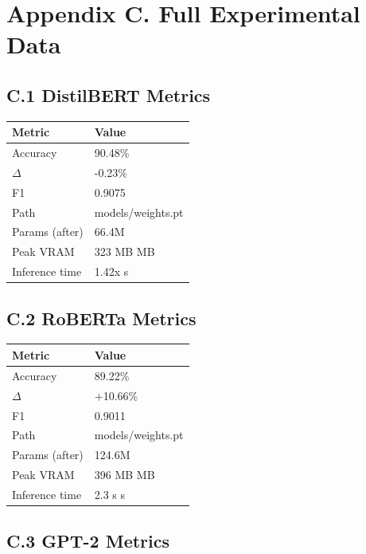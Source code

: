 
\section{Appendix C. Full Experimental Data}

\subsection{C.1 DistilBERT Metrics}

\begin{table}[H]
\centering
\small
\begin{tabular}{ll}
\toprule
\textbf{Metric} & \textbf{Value} \\
\midrule
Accuracy & 90.48\% \\
$\Delta$ & -0.23\% \\
F1 & 0.9075 \\
Path & models/weights.pt \\
Params (after) & 66.4M \\
Peak VRAM & 323 MB MB \\
Inference time & 1.42x s \\
\bottomrule
\end{tabular}
\end{table}

\subsection{C.2 RoBERTa Metrics}

\begin{table}[H]
\centering
\small
\begin{tabular}{ll}
\toprule
\textbf{Metric} & \textbf{Value} \\
\midrule
Accuracy & 89.22\% \\
$\Delta$ & +10.66\% \\
F1 & 0.9011 \\
Path & models/weights.pt \\
Params (after) & 124.6M \\
Peak VRAM & 396 MB MB \\
Inference time & 2.3 s s \\
\bottomrule
\end{tabular}
\end{table}

\subsection{C.3 GPT-2 Metrics}

